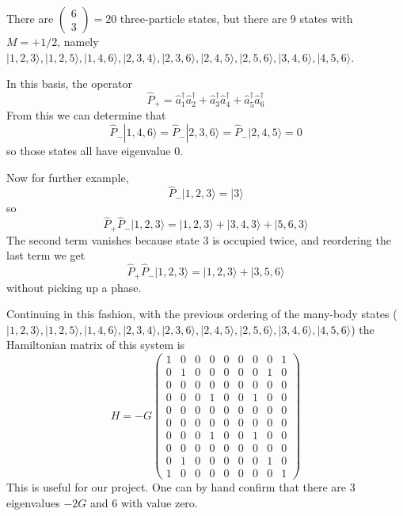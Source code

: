 \documentclass[graybox,sectrefs,envcountresetchap,open=right]{svmonodo}
\begin{document}
\noindent
 There are  $\left( \begin{array}{c}6 \\ 3 \end{array} \right) = 20$ three-particle states, but there 
are 9 states with $M = +1/2$, namely
$| 1,2,3 \rangle, |1,2,5\rangle, | 1,4,6 \rangle, | 2,3,4 \rangle, |2,3,6 \rangle, | 2,4,5 \rangle, | 2, 5, 6 \rangle, |3,4,6 \rangle, | 4,5,6 \rangle$.











In this basis, the operator 
\[
\hat{P}_+
= \hat{a}^\dagger_1 \hat{a}^\dagger_2 + \hat{a}^\dagger_3 \hat{a}^\dagger_4 +
\hat{a}^\dagger_5 \hat{a}^\dagger_6 
\]
From this we can determine that 
\[
\hat{P}_- | 1, 4, 6 \rangle = \hat{P}_- | 2, 3, 6 \rangle
= \hat{P}_- | 2, 4, 5 \rangle = 0
\]
so those states all have eigenvalue 0.


Now for further example, 
\[
\hat{P}_- | 1,2,3 \rangle = | 3 \rangle
\]
so
\[
\hat{P}_+ \hat{P}_- | 1,2,3\rangle = | 1,2,3\rangle+ | 3,4,3\rangle + | 5,6,3\rangle
\]
The second term vanishes because state 3 is occupied twice, and reordering the last 
term we
get
\[
\hat{P}_+ \hat{P}_- | 1,2,3\rangle = | 1,2,3\rangle+ |3, 5,6\rangle
\]
without picking up a phase.



Continuing in this fashion, with the previous ordering of the many-body states
(  $| 1,2,3 \rangle, |1,2,5\rangle, | 1,4,6 \rangle, | 2,3,4 \rangle, |2,3,6 \rangle, | 2,4,5 \rangle, | 2, 5, 6 \rangle, |3,4,6 \rangle, | 4,5,6 \rangle$) the 
Hamiltonian matrix of this system is 
\[
H = -G\left( 
\begin{array}{ccccccccc}
1 & 0 & 0 & 0 & 0 & 0 & 0 & 0 & 1  \\
0 & 1 & 0 & 0 & 0 & 0 & 0 & 1 & 0  \\
0 & 0 & 0 & 0 & 0 & 0 & 0 & 0 & 0  \\
0 & 0 & 0 & 1 & 0 & 0 & 1 & 0 & 0  \\
0 & 0 & 0 & 0 & 0 & 0 & 0 & 0 & 0  \\
0 & 0 & 0 & 0 & 0 & 0 & 0 & 0 & 0  \\
0 & 0 & 0 & 1 & 0 & 0 & 1 & 0 & 0  \\
0 & 0 & 0 & 0 & 0 & 0 & 0 & 0 & 0  \\
0 & 1 & 0 & 0 & 0 & 0 & 0 & 1 & 0  \\
1 & 0 & 0 & 0 & 0 & 0 & 0 & 0 & 1  
\end{array} \right )
\] 
This is useful for our project.  One can by hand confirm 
that there are 3 eigenvalues $-2G$ and 6 with value zero.
\end{document}
